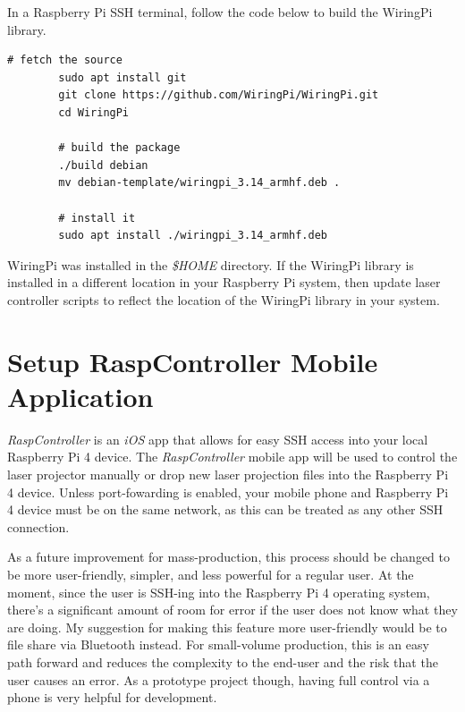 \documentclass[journal]{IEEEtran}
\begin{document}
    In a Raspberry Pi SSH terminal, follow the code below to build the WiringPi library.
    \begin{lstlisting}[frame=single, basicstyle=\ttfamily\footnotesize, breaklines=true]
        # fetch the source
        sudo apt install git
        git clone https://github.com/WiringPi/WiringPi.git
        cd WiringPi

        # build the package
        ./build debian
        mv debian-template/wiringpi_3.14_armhf.deb .

        # install it
        sudo apt install ./wiringpi_3.14_armhf.deb
    \end{lstlisting}

    WiringPi was installed in the \emph{\$HOME} directory. 
    If the WiringPi library is installed in a different location in your Raspberry Pi system, then update laser controller scripts to reflect the location of the WiringPi library in your system.

    \section{Setup RaspController Mobile Application}
    \emph{RaspController} is an \emph{iOS} app that allows for easy SSH access into your local Raspberry Pi 4 device.
    The \emph{RaspController} mobile app will be used to control the laser projector manually or drop new laser projection files into the Raspberry Pi 4 device.
    Unless port-fowarding is enabled, your mobile phone and Raspberry Pi 4 device must be on the same network, as this can be treated as any other SSH connection.

    As a future improvement for mass-production, this process should be changed to be more user-friendly, simpler, and less powerful for a regular user.
    At the moment, since the user is SSH-ing into the Raspberry Pi 4 operating system, there's a significant amount of room for error if the user does not know what they are doing.
    My suggestion for making this feature more user-friendly would be to file share via Bluetooth instead.
    For small-volume production, this is an easy path forward and reduces the complexity to the end-user and the risk that the user causes an error.
    As a prototype project though, having full control via a phone is very helpful for development.
    
\end{document}
